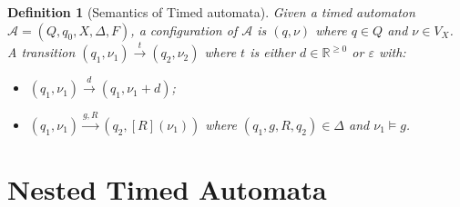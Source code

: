 \documentclass{llncs}
\newtheorem{Def}{Definition}
\newcommand{\nnegreal}{\mathbb{R}^{\geq 0}}
\begin{document}

\begin{Def}[Semantics of Timed automata]
  Given a timed automaton $\mathcal{A}=(Q,q_0,X,\Delta,F)$, a configuration
  of $\mathcal{A}$ is $(q,\nu)$ where $q\in Q$ and $\nu\in V_X$.
  A transition $(q_1,\nu_1)\xrightarrow{t}(q_2,\nu_2)$ where $t$ is either $d\in\nnegreal$ or
  $\varepsilon$ with:
  \begin{itemize}
    \item $(q_1,\nu_1)\xrightarrow{d}(q_1,\nu_1+d)$;
    \item $(q_1,\nu_1)\xrightarrow{g,R}(q_2,[R](\nu_1))$ where $(q_1,g,R,q_2)\in\Delta$ and $\nu_1\models g$.
  \end{itemize}
\end{Def}

\section{Nested Timed Automata}
\end{document}
